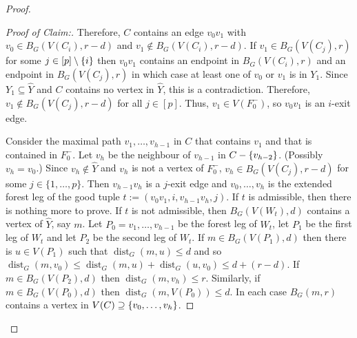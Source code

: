 \documentclass{patmorin}
\newenvironment{clmproof}{\begin{proof}[Proof of Claim:]\renewcommand{\qedsymbol}{\rule{1ex}{1ex}}}{\end{proof}}
\DeclareMathOperator{\dist}{dist}
\DeclarePairedDelimiter\set{\{}{\}}
\begin{document}
\begin{proof}
\begin{clmproof}
  Therefore, $C$ contains an edge $v_0v_1$ with $v_0\in B_G(V(C_i),r-d)$ and $v_1\not\in B_G(V(C_i),r-d)$.  
  If $v_1\in B_G(V(C_j),r)$ for some $j\in[p]\setminus\set{i}$ then $v_0v_1$ contains an endpoint in $B_G(V(C_i),r)$ and an endpoint in $B_G(V(C_j),r)$ in which case at least one of $v_0$ or $v_1$ is in $Y_1$. Since $Y_1\subseteq \widehat{Y}$ and $C$ contains no vertex in $\widehat{Y}$, this is a contradiction.
  Therefore, $v_1\not\in B_G(V(C_j),r-d)$ for all $j\in[p]$. 
  Thus, $v_1\in V(F^-_0)$, so $v_0v_1$ is an $i$-exit edge.

  Consider the maximal path $v_1,\ldots,v_{h-1}$ in $C$ that contains $v_1$ and that is contained in $F_0^-$. Let $v_h$ be the neighbour of $v_{h-1}$ in $C-\set{v_{h-2}}$.  (Possibly $v_h=v_0$.)  Since $v_h\notin \widehat{Y}$ and $v_h$ is not a vertex of $F_0^-$, $v_h\in B_G(V(C_j),r-d)$ for some $j\in\{1,\ldots,p\}$.   Then $v_{h-1}v_h$ is a $j$-exit edge and $v_0,\ldots,v_{h}$ is the extended forest leg of the good tuple $t:=(v_0v_1,i,v_{h-1}v_h,j)$.   If $t$ is admissible, then there is nothing more to prove.  If $t$ is not admissible,
  then $B_G(V(W_t),d)$ contains a vertex of $\widehat{Y}$, say $m$.
  Let $P_0=v_1,\ldots,v_{h-1}$ be the forest leg of $W_t$, let $P_1$ be the first leg of $W_t$ and let $P_2$ be the second leg of $W_t$.
  If $m\in B_G(V(P_1),d)$ then there is $u\in V(P_1)$ such that $\dist_G(m,u)\leq d$ and so
  $\dist_G(m,v_0)\le \dist_G(m,u) + \dist_G(u,v_0)\le d + (r-d)$.
  If $m\in B_G(V(P_2),d)$ then $\dist_G(m,v_h)\le r$.  Similarly, if $m\in B_G(V(P_0),d)$ then $\dist_G(m,V(P_0))\le d$.  In each case $B_G(m,r)$ contains a vertex in $V(C)\supseteq \set{v_0,\ldots,v_h}$.
\end{clmproof}



\end{proof}
\end{document}
